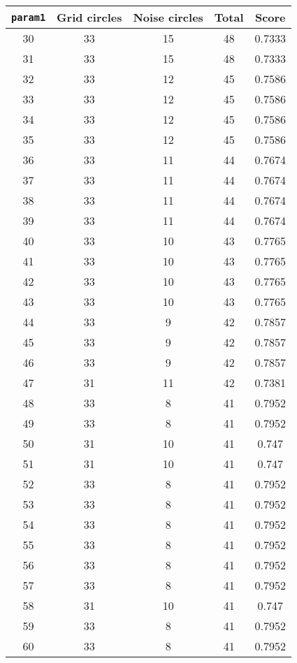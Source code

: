 \documentclass[letterpaper, 12pt]{article}
\begin{document}
\begin{longtable}{|c|c|c|c|c|}
\hline
\textbf{\texttt{param1}} & \textbf{Grid circles} & \textbf{Noise circles} & \textbf{Total} & \textbf{Score} \\
\hline
30 & 33 & 15 & 48 & 0.7333 \\
\hline
31 & 33 & 15 & 48 & 0.7333 \\
\hline
32 & 33 & 12 & 45 & 0.7586 \\
\hline
33 & 33 & 12 & 45 & 0.7586 \\
\hline
34 & 33 & 12 & 45 & 0.7586 \\
\hline
35 & 33 & 12 & 45 & 0.7586 \\
\hline
36 & 33 & 11 & 44 & 0.7674 \\
\hline
37 & 33 & 11 & 44 & 0.7674 \\
\hline
38 & 33 & 11 & 44 & 0.7674 \\
\hline
39 & 33 & 11 & 44 & 0.7674 \\
\hline
40 & 33 & 10 & 43 & 0.7765 \\
\hline
41 & 33 & 10 & 43 & 0.7765 \\
\hline
42 & 33 & 10 & 43 & 0.7765 \\
\hline
43 & 33 & 10 & 43 & 0.7765 \\
\hline
44 & 33 & 9 & 42 & 0.7857 \\
\hline
45 & 33 & 9 & 42 & 0.7857 \\
\hline
46 & 33 & 9 & 42 & 0.7857 \\
\hline
47 & 31 & 11 & 42 & 0.7381 \\
\hline
48 & 33 & 8 & 41 & 0.7952 \\
\hline
49 & 33 & 8 & 41 & 0.7952 \\
\hline
50 & 31 & 10 & 41 & 0.747 \\
\hline
51 & 31 & 10 & 41 & 0.747 \\
\hline
52 & 33 & 8 & 41 & 0.7952 \\
\hline
53 & 33 & 8 & 41 & 0.7952 \\
\hline
54 & 33 & 8 & 41 & 0.7952 \\
\hline
55 & 33 & 8 & 41 & 0.7952 \\
\hline
56 & 33 & 8 & 41 & 0.7952 \\
\hline
57 & 33 & 8 & 41 & 0.7952 \\
\hline
58 & 31 & 10 & 41 & 0.747 \\
\hline
59 & 33 & 8 & 41 & 0.7952 \\
\hline
60 & 33 & 8 & 41 & 0.7952 \\

\end{longtable}
\end{document}

